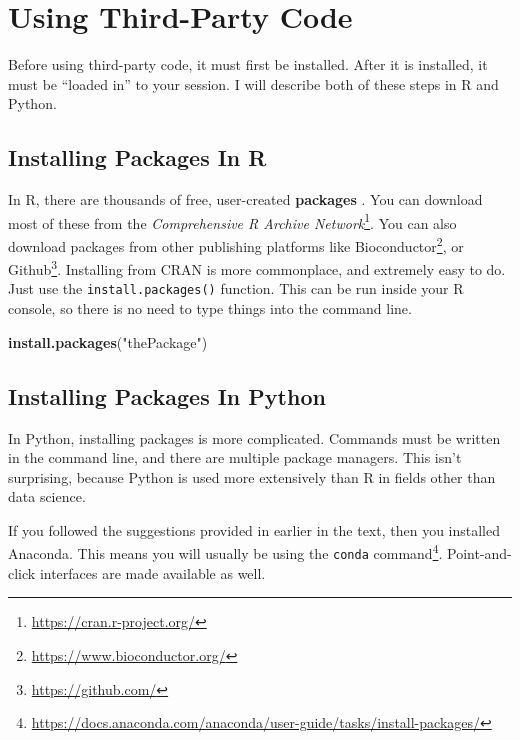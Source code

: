 \documentclass[12pt,krantz2]{krantz}
\makeatletter
\newenvironment{Shaded}{\begin{snugshade}}{\end{snugshade}}
\newcommand{\KeywordTok}[1]{\textcolor[rgb]{0.27,0.27,0.27}{\textbf{#1}}}
\newcommand{\NormalTok}[1]{#1}
\newcommand{\StringTok}[1]{\textcolor[rgb]{0.5,0.5,0.5}{#1}}
\renewcommand{\href}[2]{#2\footnote{\url{#1}}}
\newenvironment{kframe}{%
\medskip{}
\setlength{\fboxsep}{.8em}
 \def\at@end@of@kframe{}%
 \ifinner\ifhmode%
  \def\at@end@of@kframe{\end{minipage}}%
  \begin{minipage}{\columnwidth}%
 \fi\fi%
 \def\FrameCommand##1{\hskip\@totalleftmargin \hskip-\fboxsep
 \colorbox{shadecolor}{##1}\hskip-\fboxsep
     \hskip-\linewidth \hskip-\@totalleftmargin \hskip\columnwidth}%
 \MakeFramed {\advance\hsize-\width
   \@totalleftmargin\z@ \linewidth\hsize
   \@setminipage}}%
 {\par\unskip\endMakeFramed%
 \at@end@of@kframe}
\renewenvironment{Shaded}{\begin{kframe}}{\end{kframe}}
\makeatother
\begin{document}
\hypertarget{using-third-party-code}{%
\chapter{Using Third-Party Code}\label{using-third-party-code}}

Before using third-party code, it must first be installed. After it is installed, it must be ``loaded in'' to your session. I will describe both of these steps in R and Python.

\hypertarget{installing-packages-in-r}{%
\section{Installing Packages In R}\label{installing-packages-in-r}}

In R, there are thousands of free, user-created \textbf{packages} \citep{r_for_everyone}. You can download most of these from the \href{https://cran.r-project.org/}{\emph{Comprehensive R Archive Network}}. You can also download packages from other publishing platforms like \href{https://www.bioconductor.org/}{Bioconductor}, or \href{https://github.com/}{Github}. Installing from CRAN is more commonplace, and extremely easy to do. Just use the \texttt{install.packages()} function. This can be run inside your R console, so there is no need to type things into the command line.

\begin{Shaded}
\begin{Highlighting}[]
\KeywordTok{install.packages}\NormalTok{(}\StringTok{"thePackage"}\NormalTok{)}
\end{Highlighting}
\end{Shaded}

\hypertarget{installing-packages-in-python}{%
\section{Installing Packages In Python}\label{installing-packages-in-python}}

In Python, installing packages is more complicated. Commands must be written in the command line, and there are multiple package managers. This isn't surprising, because Python is used more extensively than R in fields other than data science.

If you followed the suggestions provided in earlier in the text, then you installed Anaconda. This means you will usually be using the \href{https://docs.anaconda.com/anaconda/user-guide/tasks/install-packages/}{\texttt{conda} command}. Point-and-click interfaces are made available as well.
\end{document}
